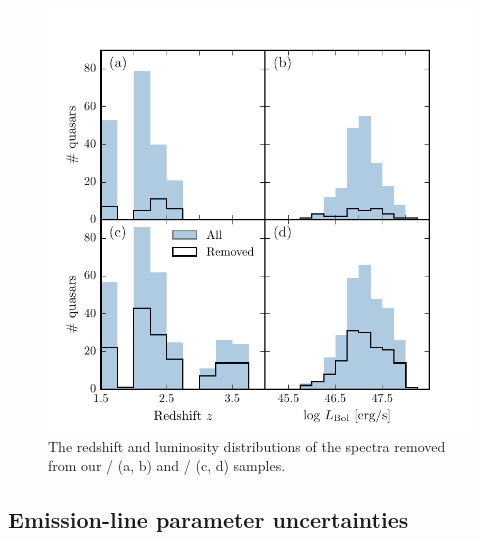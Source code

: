 \begin{figure}[h!]
    \includegraphics[width=\textwidth]{figures/chapter03/flagged_spectra.pdf} 
    \caption{The redshift and luminosity distributions of the spectra removed from our \hans/ (a, b) and \hbns/ (c, d) samples.} 
    \label{fig:flagged_spectra}
\end{figure}

\subsection{Emission-line parameter uncertainties}
\label{sec:ch3_param_errors}


